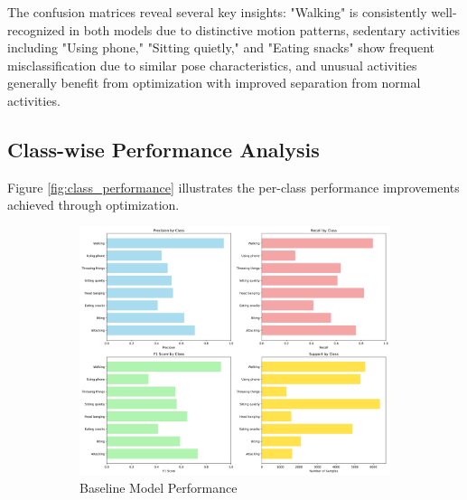 \documentclass{iopconfser}
\begin{document}
The confusion matrices reveal several key insights: "Walking" is consistently well-recognized in both models due to distinctive motion patterns, sedentary activities including "Using phone," "Sitting quietly," and "Eating snacks" show frequent misclassification due to similar pose characteristics, and unusual activities generally benefit from optimization with improved separation from normal activities.

\subsection{Class-wise Performance Analysis}

Figure \ref{fig:class_performance} illustrates the per-class performance improvements achieved through optimization.

\begin{figure}[H]
\centering
\begin{subfigure}{0.48\textwidth}
    \centering
    \includegraphics[width=\textwidth]{results/metrics/baseline/class_performance.png}
    \caption{Baseline Model Performance}
    \label{fig:baseline_class}
\end{subfigure}
\hfill
\begin{subfigure}{0.48\textwidth}
    \centering

\end{subfigure}
\end{figure}
\end{document}
